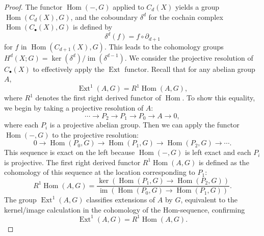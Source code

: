 \begin{proof}
	The functor $\operatorname{Hom}(-, G)$ applied to $C_{d}(X)$ yields a group $\operatorname{Hom}
	(C_{d}(X), G)$, and the coboundary $\delta^{d}$ for the cochain complex
	$\operatorname{Hom}(C_{\bullet}(X), G)$ is defined by
	\[
		\delta^{d}(f) = f \circ \partial_{d+1}
	\]
	for $f$ in $\operatorname{Hom}(C_{d+1}(X), G)$. This leads to the cohomology groups
	$H^{d}(X; G) = \ker(\delta^{d}) / \operatorname{im}(\delta^{d-1})$. We
	consider the projective resolution of $C_{\bullet}(X)$ to effectively apply
	the $\operatorname{Ext}$ functor. Recall that for any abelian group $A$,
	\[
		\operatorname{Ext}^{1}(A, G) = R^{1} \operatorname{Hom}(A, G),
	\]
	where $R^{1}$ denotes the first right derived functor of $\operatorname{Hom}$.
	To show this equality, we begin by taking a projective resolution of $A$:
	\[
		\cdots \to P_{2} \to P_{1} \to P_{0} \to A \to 0,
	\]
	where each $P_{i}$ is a projective abelian group. Then we can apply the
	functor $\operatorname{Hom}(-, G)$ to the projective resolution:
	\[
		0 \to \operatorname{Hom}(P_{0}, G) \to \operatorname{Hom}(P_{1}, G) \to \operatorname{Hom}
		(P_{2}, G) \to \cdots.
	\]
	This sequence is exact on the left because $\operatorname{Hom}(-, G)$ is left exact
	and each $P_{i}$ is projective. The first right derived functor
	$R^{1}\operatorname{Hom}(A, G)$ is defined as the cohomology of this sequence
	at the location corresponding to $P_{1}$:
	\[
		R^{1} \operatorname{Hom}(A, G) = \frac{\ker(\operatorname{Hom}(P_{1}, G) \to
		\operatorname{Hom}(P_{2}, G))}{\operatorname{im}(\operatorname{Hom}(P_{0}, G)
		\to \operatorname{Hom}(P_{1}, G))}.
	\]
	The group $\operatorname{Ext}^{1}(A, G)$ classifies extensions of $A$ by $G$,
	equivalent to the kernel/image calculation in the cohomology of the
	$\text{Hom}$-sequence, confirming
	\[
		\operatorname{Ext}^{1}(A, G) = R^{1} \operatorname{Hom}(A, G).
	\]


\end{proof}
